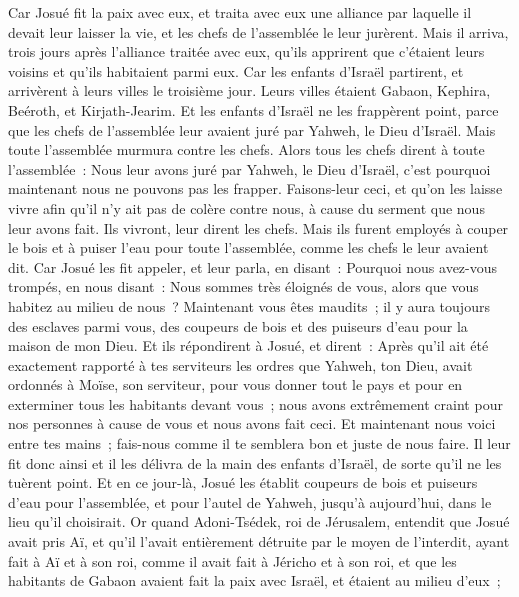 \begin{multicols}{2}
Car Josué fit la paix avec eux, et traita avec eux une alliance par laquelle il devait leur laisser la vie, et les chefs de l'assemblée le leur jurèrent.
Mais il arriva, trois jours après l'alliance traitée avec eux, qu'ils apprirent que c'étaient leurs voisins et qu'ils habitaient parmi eux.
Car les enfants d'Israël partirent, et arrivèrent à leurs villes le troisième jour. Leurs villes étaient Gabaon, Kephira, Beéroth, et Kirjath-Jearim.
Et les enfants d'Israël ne les frappèrent point, parce que les chefs de l'assemblée leur avaient juré par Yahweh, le Dieu d'Israël. Mais toute l'assemblée murmura contre les chefs.
Alors tous les chefs dirent à toute l'assemblée~: Nous leur avons juré par Yahweh, le Dieu d'Israël, c'est pourquoi maintenant nous ne pouvons pas les frapper.
Faisons-leur ceci, et qu'on les laisse vivre afin qu'il n'y ait pas de colère contre nous, à cause du serment que nous leur avons fait.
Ils vivront, leur dirent les chefs. Mais ils furent employés à couper le bois et à puiser l'eau pour toute l'assemblée, comme les chefs le leur avaient dit.
Car Josué les fit appeler, et leur parla, en disant~: Pourquoi nous avez-vous trompés, en nous disant~: Nous sommes très éloignés de vous, alors que vous habitez au milieu de nous~?
Maintenant vous êtes maudits~; il y aura toujours des esclaves parmi vous, des coupeurs de bois et des puiseurs d'eau pour la maison de mon Dieu.
Et ils répondirent à Josué, et dirent~: Après qu'il ait été exactement rapporté à tes serviteurs les ordres que Yahweh, ton Dieu, avait ordonnés à Moïse, son serviteur, pour vous donner tout le pays et pour en exterminer tous les habitants devant vous~; nous avons extrêmement craint pour nos personnes à cause de vous et nous avons fait ceci. 
Et maintenant nous voici entre tes mains~; fais-nous comme il te semblera bon et juste de nous faire.
Il leur fit donc ainsi et il les délivra de la main des enfants d'Israël, de sorte qu'il ne les tuèrent point.
Et en ce jour-là, Josué les établit coupeurs de bois et puiseurs d'eau pour l'assemblée, et pour l'autel de Yahweh, jusqu'à aujourd'hui, dans le lieu qu'il choisirait.
\VerseOne{}Or quand Adoni-Tsédek, roi de Jérusalem, entendit que Josué avait pris Aï, et qu'il l'avait entièrement détruite par le moyen de l'interdit, ayant fait à Aï et à son roi, comme il avait fait à Jéricho et à son roi, et que les habitants de Gabaon avaient fait la paix avec Israël, et étaient au milieu d'eux~;

\end{multicols}
